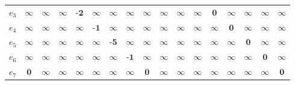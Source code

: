 \documentclass{article}
\theoremstyle{definition}
\begin{document}
\begin{tabular}{c | cccccccccccccccc}
$e_3$	&$\infty$	&$\infty$	&$\infty$	&$\textbf{-2}$	&$\infty$	&$\infty$	&$\infty$	&$\infty$	&$\infty$	&$\infty$	&$\infty$	&$\textbf{0}$	&$\infty$	&$\infty$	&$\infty$	&$\infty$\\
$e_4$	&$\infty$	&$\infty$	&$\infty$	&$\infty$	&$\textbf{-1}$	&$\infty$	&$\infty$	&$\infty$	&$\infty$	&$\infty$	&$\infty$	&$\infty$	&$\textbf{0}$	&$\infty$	&$\infty$	&$\infty$\\
$e_5$	&$\infty$	&$\infty$	&$\infty$	&$\infty$	&$\infty$	&$\textbf{-5}$	&$\infty$	&$\infty$	&$\infty$	&$\infty$	&$\infty$	&$\infty$	&$\infty$	&$\textbf{0}$	&$\infty$	&$\infty$\\
$e_6$	&$\infty$	&$\infty$	&$\infty$	&$\infty$	&$\infty$	&$\infty$	&$\textbf{-1}$	&$\infty$	&$\infty$	&$\infty$	&$\infty$	&$\infty$	&$\infty$	&$\infty$	&$\textbf{0}$	&$\infty$\\
$e_7$	&$\textbf{0}$	&$\infty$	&$\infty$	&$\infty$	&$\infty$	&$\infty$	&$\infty$	&$\textbf{0}$	&$\infty$	&$\infty$	&$\infty$	&$\infty$	&$\infty$	&$\infty$	&$\infty$	&$\textbf{0}$\\
\end{tabular}
\end{document}
